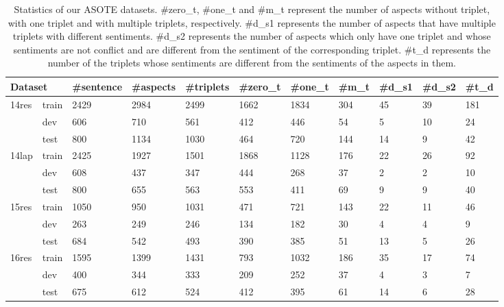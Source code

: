 \documentclass[11pt]{article}
\begin{document}
\begin{table*}
	\centering
	\begin{tabular}{|l|l|l|l|l|l|l|l|l|l|l|}
		\hline
		\multicolumn{2}{|l|}{Dataset}  & \#sentence & \#aspects & \#triplets & \#zero\_t & \#one\_t & \#m\_t & \#d\_s1 & \#d\_s2 & \#t\_d \\ \hline
		\multirow{3}{*}{14res} & train & 2429       & 2984      & 2499       & 1662      & 1834     & 304        & 45      & 39      & 181    \\ \cline{2-11} 
		& dev   & 606        & 710       & 561        & 412       & 446      & 54         & 5       & 10      & 24     \\ \cline{2-11} 
		& test  & 800        & 1134      & 1030       & 464       & 720      & 144        & 14      & 9       & 42     \\ \hline
		\multirow{3}{*}{14lap} & train & 2425       & 1927      & 1501       & 1868      & 1128     & 176        & 22      & 26      & 92     \\ \cline{2-11} 
		& dev   & 608        & 437       & 347        & 444       & 268      & 37         & 2       & 2       & 10     \\ \cline{2-11} 
		& test  & 800        & 655       & 563        & 553       & 411      & 69         & 9       & 9       & 40     \\ \hline
		\multirow{3}{*}{15res} & train & 1050       & 950       & 1031       & 471       & 721      & 143        & 22      & 11      & 46     \\ \cline{2-11} 
		& dev   & 263        & 249       & 246        & 134       & 182      & 30         & 4       & 4       & 9      \\ \cline{2-11} 
		& test  & 684        & 542       & 493        & 390       & 385      & 51         & 13      & 5       & 26     \\ \hline
		\multirow{3}{*}{16res} & train & 1595       & 1399      & 1431       & 793       & 1032     & 186        & 35      & 17      & 74     \\ \cline{2-11} 
		& dev   & 400        & 344       & 333        & 209       & 252      & 37         & 4       & 3       & 7      \\ \cline{2-11} 
		& test  & 675        & 612       & 524        & 412       & 395      & 61         & 14      & 6       & 28     \\ \hline
	\end{tabular}
	\caption{\label{ASOTE-datasets} Statistics of our ASOTE datasets. \#zero\_t, \#one\_t and \#m\_t represent the number of aspects without triplet, with one triplet and with multiple triplets, respectively. \#d\_s1 represents the number of aspects that have multiple triplets with different sentiments. \#d\_s2 represents the number of aspects which only have one triplet and whose sentiments are not conflict and are different from the sentiment of the corresponding triplet. \#t\_d represents the number of the triplets whose sentiments are different from the sentiments of the aspects in them.}
\end{table*}
\end{document}
